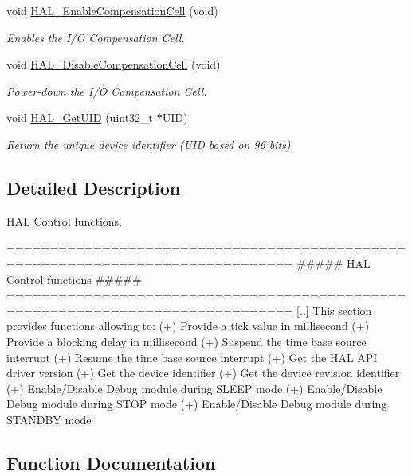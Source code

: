 \begin{DoxyCompactItemize}
void \mbox{\hyperlink{group___h_a_l___exported___functions___group2_ga20b6ca07582e10aec5e15ad2fda7dfc1}{H\+A\+L\+\_\+\+Enable\+Compensation\+Cell}} (void)
\begin{DoxyCompactList}\small\item\em Enables the I/O Compensation Cell. \end{DoxyCompactList}\item 
void \mbox{\hyperlink{group___h_a_l___exported___functions___group2_ga653f1166b0e37afd40372550d806e667}{H\+A\+L\+\_\+\+Disable\+Compensation\+Cell}} (void)
\begin{DoxyCompactList}\small\item\em Power-\/down the I/O Compensation Cell. \end{DoxyCompactList}\item 
void \mbox{\hyperlink{group___h_a_l___exported___functions___group2_ga6b943c94114771a9c29f36042196676e}{H\+A\+L\+\_\+\+Get\+U\+ID}} (uint32\+\_\+t $\ast$U\+ID)
\begin{DoxyCompactList}\small\item\em Return the unique device identifier (U\+ID based on 96 bits) \end{DoxyCompactList}\end{DoxyCompactItemize}


\subsection{Detailed Description}
H\+AL Control functions. 

\begin{DoxyVerb} ===============================================================================
                      ##### HAL Control functions #####
 ===============================================================================
    [..]  This section provides functions allowing to:
      (+) Provide a tick value in millisecond
      (+) Provide a blocking delay in millisecond
      (+) Suspend the time base source interrupt
      (+) Resume the time base source interrupt
      (+) Get the HAL API driver version
      (+) Get the device identifier
      (+) Get the device revision identifier
      (+) Enable/Disable Debug module during SLEEP mode
      (+) Enable/Disable Debug module during STOP mode
      (+) Enable/Disable Debug module during STANDBY mode\end{DoxyVerb}
 

\subsection{Function Documentation}
\mbox{\label{group___h_a_l___exported___functions___group2_gac7820d0561f19999a68d714655b901b5}} 
